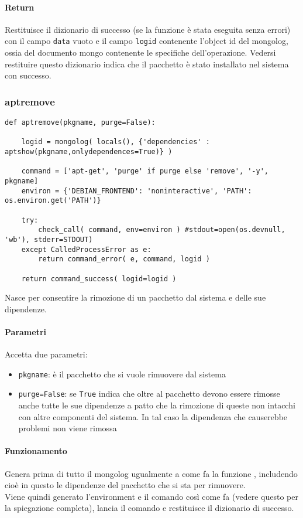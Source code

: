 \documentclass[11pt]{article}
\begin{document}
\paragraph{Return}
Restituisce il dizionario di successo (se la funzione è stata eseguita senza errori) con il campo \texttt{data} vuoto
e il campo \texttt{logid} contenente l'object id del mongolog, ossia del documento mongo contenente le specifiche
dell'operazione. Vedersi restituire questo dizionario indica che il pacchetto è stato installato nel sistema
con successo.

\subsubsection{aptremove}\label{aptremove}
\begin{lstlisting}
def aptremove(pkgname, purge=False):

    logid = mongolog( locals(), {'dependencies' : aptshow(pkgname,onlydependences=True)} )

    command = ['apt-get', 'purge' if purge else 'remove', '-y', pkgname]
    environ = {'DEBIAN_FRONTEND': 'noninteractive', 'PATH': os.environ.get('PATH')}

    try:
        check_call( command, env=environ ) #stdout=open(os.devnull, 'wb'), stderr=STDOUT)
    except CalledProcessError as e:
        return command_error( e, command, logid )
    
    return command_success( logid=logid )
\end{lstlisting}
Nasce per consentire la rimozione di un pacchetto dal sistema e delle sue dipendenze.
\paragraph{Parametri}
Accetta due parametri:
\begin{itemize}
	\item{\texttt{pkgname}: è il pacchetto che si vuole rimuovere dal sistema}
	\item{\texttt{purge=False}: se \texttt{True} indica che oltre al pacchetto devono essere rimosse anche tutte le
		sue dipendenze a patto che la rimozione di queste non intacchi con altre componenti del sistema. In tal
		caso la dipendenza che causerebbe problemi non viene rimossa}
\end{itemize}
\paragraph{Funzionamento}
Genera prima di tutto il mongolog ugualmente a come fa la funzione , includendo cioè in questo
le dipendenze del pacchetto che si sta per rimuovere.\\
Viene quindi generato l'environment e il comando così come fa  (vedere questo per la spiegazione
completa), lancia il comando e restituisce il dizionario di successo.
\end{document}
